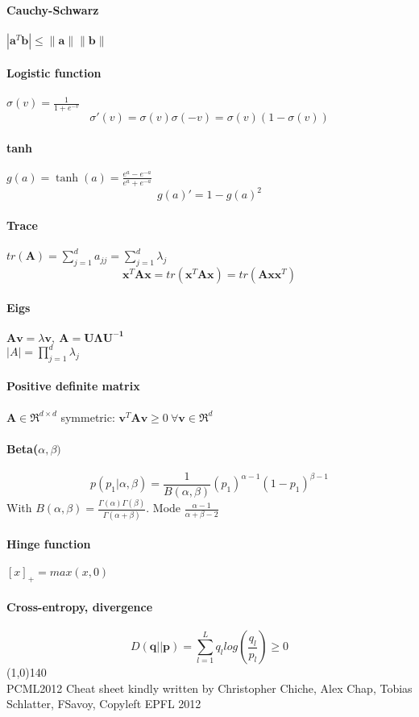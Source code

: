 \documentclass[7pt]{scrartcl}
\renewcommand{\vec}{\mathbf}
\begin{document}
\begin{multicols}{4}
\paragraph{Cauchy-Schwarz}
 $|\vec a ^T \vec b|\leq \| \vec a \| \| \vec b \|$
\paragraph{Logistic function}
$\sigma(v) = \frac{1}{1+e^{-v}}$
$$\sigma'(v) = \sigma(v)\sigma(-v) = \sigma(v)(1-\sigma(v))$$
\paragraph{tanh}
$g(a)=\tanh(a)=\frac{e^a-e^{-a}}{e^a + e^{-a}}$
$$g(a)'=1 - g(a)^2$$
\paragraph{Trace}
$tr(\vec{A}) = \sum_{j=1}^{d}a_{jj} = \sum_{j=1}^d \lambda_j$
\[\vec{x}^T \vec{A} \vec{x} = tr(\vec{x}^T \vec{A} \vec{x}) = tr(\vec{A} \vec{xx}^T)\]
\paragraph{Eigs}
$\vec{Av} = \lambda \vec{v}, ~\vec{A} = \vec{U \Lambda U^{-1}}$\\
$|A| = \prod_{j=1}^d \lambda_j$
\paragraph{Positive definite matrix} $\vec A \in \Re^ {d\times d}$ symmetric:
$\vec v^T \vec A \vec v \geq 0 ~ \forall \vec v \in \Re^d$
\paragraph{Beta($\alpha,\beta)$}
\[p(p_1|\alpha,\beta) = \frac{1}{B(\alpha,\beta)}(p_1)^{\alpha-1}(1-p_1)^{\beta -1}\]
With $B(\alpha,\beta) = \frac{\Gamma(\alpha)\Gamma(\beta)}{\Gamma(\alpha + \beta)}$.
Mode $\frac{\alpha - 1}{\alpha + \beta - 2}$
\paragraph{Hinge function}
$[x]_+ = max(x,0)$
\paragraph{Cross-entropy, divergence}
\[D(\vec{q}||\vec{p}) = \sum_{l=1}^L q_l log(\frac{q_l}{p_l}) \geq 0\]
\line(1,0){140} \\
\tiny
PCML2012 Cheat sheet kindly written by Christopher Chiche, Alex Chap, Tobias Schlatter, FSavoy, Copyleft EPFL 2012 
\end{multicols}
\end{document}
